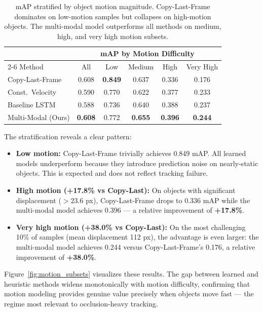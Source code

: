 \documentclass{article}
\begin{document}
\begin{table}[h]
\centering
\begin{tabular}{lccccc}
\toprule
& \multicolumn{5}{c}{mAP by Motion Difficulty} \\
\cmidrule(lr){2-6}
Method & All & Low & Medium & High & Very High \\
\midrule
Copy-Last-Frame & 0.608 & \textbf{0.849} & 0.637 & 0.336 & 0.176 \\
Const.\ Velocity & 0.590 & 0.770 & 0.622 & 0.377 & 0.233 \\
Baseline LSTM & 0.588 & 0.736 & 0.640 & 0.388 & 0.237 \\
Multi-Modal (Ours) & \textbf{0.608} & 0.772 & \textbf{0.655} & \textbf{0.396} & \textbf{0.244} \\
\bottomrule
\end{tabular}
\caption{mAP stratified by object motion magnitude. Copy-Last-Frame dominates on low-motion samples but collapses on high-motion objects. The multi-modal model outperforms all methods on medium, high, and very high motion subsets.}
\label{tab:motion_subsets}
\end{table}

The stratification reveals a clear pattern:

\begin{itemize}
\item \textbf{Low motion:} Copy-Last-Frame trivially achieves 0.849 mAP. All learned models underperform because they introduce prediction noise on nearly-static objects. This is expected and does not reflect tracking failure.

\item \textbf{High motion (+17.8\% vs Copy-Last):} On objects with significant displacement ($>23.6$ px), Copy-Last-Frame drops to 0.336 mAP while the multi-modal model achieves 0.396 --- a relative improvement of \textbf{+17.8\%}.

\item \textbf{Very high motion (+38.0\% vs Copy-Last):} On the most challenging 10\% of samples (mean displacement 112 px), the advantage is even larger: the multi-modal model achieves 0.244 versus Copy-Last-Frame's 0.176, a relative improvement of \textbf{+38.0\%}.
\end{itemize}

Figure~\ref{fig:motion_subsets} visualizes these results. The gap between learned and heuristic methods widens monotonically with motion difficulty, confirming that motion modeling provides genuine value precisely when objects move fast --- the regime most relevant to occlusion-heavy tracking.
\end{document}
